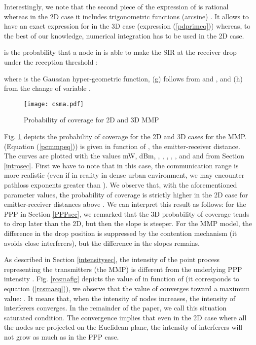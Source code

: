 \documentclass{sig-alternate-05-2015}
\begin{document}
Interestingly, we note that the second piece of the expression of  is rational whereas in the 2D case it includes trigonometric functions (arcsine) \cite{elsawy13}. It allows to have an exact expression for  in the 3D case (expression (\ref{pdprimeq})) whereas, to the best of our knowledge, numerical integration has to be used in the 2D case.

 is the probability that a node in  is able to make the SIR at the receiver drop under the reception threshold :


where  is the Gaussian hyper-geometric function, (g) follows from  and , and (h) from the change of variable .


\begin{figure}[ht]
  \centering
  \texttt{[image: csma.pdf]}
  \caption{Probability of coverage for 2D and 3D MMP}
  \label{csmafig}
\end{figure}

Fig. \ref{csmafig} depicts the probability of coverage for the 2D and 3D cases for the MMP.  (Equation (\ref{pcmmpeq})) is given in function of , the emitter-receiver distance. The curves are plotted with the values mW, dBm, , , , , , and  and  from Section \ref{introsec}. First we have to note that in this case, the communication range is more realistic (even if in reality in dense urban environment, we may encounter pathloss exponents greater than ). We observe that, with the aforementioned parameter values, the probability of coverage is strictly higher in the 2D case for emitter-receiver distances above . We can interpret this result as follows: for the PPP in Section \ref{PPPsec}, we remarked that the 3D probability of coverage tends to drop later than the 2D, but then the slope is steeper. For the MMP model, the difference in the drop position is suppressed by the contention mechanism (it avoids close interferers), but the difference in the slopes remains.


As described in Section \ref{intensitysec}, the intensity  of the point process representing the transmitters (the MMP) is different from the underlying PPP intensity . Fig. \ref{rcsmafig} depicts the value of  in function of  (it corresponds to equation (\ref{rcsmaeq})), we observe that the value of  converges toward a maximum value: . It means that, when the intensity of nodes increases, the intensity of interferers converges. In the remainder of the paper, we call this situation saturated condition. The convergence implies that even in the 2D case where all the nodes are projected on the Euclidean plane, the intensity of interferers will not grow as much as in the PPP case.
\end{document}
